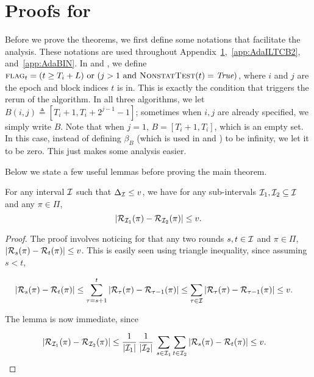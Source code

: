 
\section{Proofs for \AdaEG}\label{app:AdaEG2}
Before we prove the theorems, we first define some notations that facilitate the analysis. These notations are used throughout Appendix~\ref{app:AdaEG2},~\ref{app:AdaILTCB2}, and~\ref{app:AdaBIN}. In \AdaEG and \AdaILTCB, we define $\textsc{flag}_t=(t\geq T_i+L) \text{ or } (j>1 \text{ and }\textsc{NonstatTest}(t)=\textit{True})$, where $i$ and $j$ are the epoch and block indices $t$ is in. 
This is exactly the condition that triggers the rerun of the algorithm. In all three algorithms, we let $B(i,j)\triangleq [T_i+1, T_i+2^{j-1}-1]$; sometimes when $i, j$ are already specified, we simply write $B$. Note that when $j=1$, $B=[T_i+1, T_i]$, which is an empty set. In this case, instead of defining $\beta_B$ (which is used in \AdaEG and \AdaBIN) to be infinity, we let it to be zero. This just makes some analysis easier. 

Below we state a few useful lemmas before proving the main theorem.
\begin{lemma}
  For any interval ${\mathcal{I}}$ such that $\Delta_{\mathcal{I}} \leq v$, we have for
  any sub-intervals ${\mathcal{I}}_1, {\mathcal{I}}_2 \subseteq {\mathcal{I}}$ and any $\pi \in \Pi$, 
  \[
  |{\mathcal{R}}_{{\mathcal{I}}_1}(\pi) - {\mathcal{R}}_{{\mathcal{I}}_2}(\pi)| \leq v. 
  \]
  \label{lemma:var-bound}
\end{lemma}

\begin{proof}
  The proof involves noticing for that any two rounds $s,t \in {\mathcal{I}}$
  and $\pi \in \Pi$, $|{\mathcal{R}}_s(\pi) - {\mathcal{R}}_t(\pi)| \leq
  v$. This is easily seen using triangle
  inequality, since assuming $s < t$, 

  \begin{align*}
    |{\mathcal{R}}_s(\pi) - {\mathcal{R}}_t(\pi)| &\leq \sum_{\tau=s+1}^t
    |{\mathcal{R}}_{\tau}(\pi) - {\mathcal{R}}_{\tau-1}(\pi)| \leq \sum_{\tau \in
    {\mathcal{I}}} |{\mathcal{R}}_{\tau}(\pi) - {\mathcal{R}}_{\tau-1}(\pi)| \leq v. 
  \end{align*}

  The lemma is now immediate, since 

  \begin{align*}
    |{\mathcal{R}}_{{\mathcal{I}}_1}(\pi) - {\mathcal{R}}_{{\mathcal{I}}_2}(\pi)| &\leq
    \frac{1}{|{\mathcal{I}}_1|}\, \frac{1}{|{\mathcal{I}}_2|}\, \sum_{s \in {\mathcal{I}}_1}
    \sum_{t \in {\mathcal{I}}_2} |{\mathcal{R}}_s(\pi) - {\mathcal{R}}_t(\pi)| \leq v.
  \end{align*}
\end{proof}


